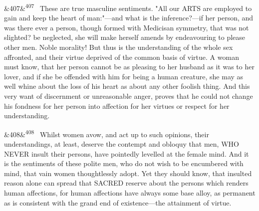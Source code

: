 \documentclass[12pt]{article}
\newcommand{\para}[1][]{\par\noindent\ifx&#1&\else\textsuperscript{\footnotesize #1}~\fi}
\begin{document}
\para[407] These are true masculine sentiments. "All our ARTS are employed to gain and keep the heart of man:"---and what is the inference?---if her person, and was there ever a person, though formed with Medicisan symmetry, that was not slighted? be neglected, she will make herself amends by endeavouring to please other men. Noble morality! But thus is the understanding of the whole sex affronted, and their virtue deprived of the common basis of virtue. A woman must know, that her person cannot be as pleasing to her husband as it was to her lover, and if she be offended with him for being a human creature, she may as well whine about the loss of his heart as about any other foolish thing. And this very want of discernment or unreasonable anger, proves that he could not change his fondness for her person into affection for her virtues or respect for her understanding.

\para[408] Whilst women avow, and act up to such opinions, their understandings, at least, deserve the contempt and obloquy that men, WHO NEVER insult their persons, have pointedly levelled at the female mind. And it is the sentiments of these polite men, who do not wish to be encumbered with mind, that vain women thoughtlessly adopt. Yet they should know, that insulted reason alone can spread that SACRED reserve about the persons which renders human affections, for human affections have always some base alloy, as permanent as is consistent with the grand end of existence---the attainment of virtue.
\end{document}
